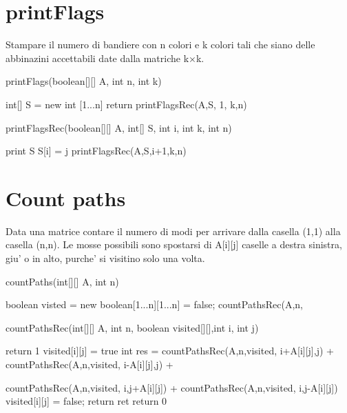 \documentclass[oneside]{book}
\begin{document}
\section{printFlags}
Stampare il numero di bandiere con n colori e k colori tali che siano delle abbinazini accettabili date dalla matriche k$\times$k.

\begin{algorithm}
\caption{printFlags(boolean[][] A, int n, int k)\label{alg:cap}}
\begin{algorithmic}
\State int[] S = new int [1...n]
\State return printFlagsRec(A,S, 1, k,n)
\end{algorithmic}
\end{algorithm}

\begin{algorithm}
\caption{printFlagsRec(boolean[][] A, int[] S, int i, int k, int n)\label{alg:cap}}
\begin{algorithmic}
\If{}
	\State print S
\Else
		\If{i == 1 \textbf{or} A[j][S[i-1]}
			\State S[i] = j
			printFlagsRec(A,S,i+1,k,n)
		\EndIf

	\EndFor
\EndIf

\end{algorithmic}
\end{algorithm}
\newpage
\section{Count paths}
Data una matrice contare il numero di modi per arrivare dalla casella (1,1) alla casella (n,n). Le mosse possibili sono spostarsi di A[i][j] caselle a destra sinistra, giu' o in alto, purche' si visitino solo una volta.

\begin{algorithm}
\caption{countPaths(int[][] A, int n)}
\begin{algorithmic}
\State boolean visted = new boolean[1...n][1...n] = false;
\State countPathsRec(A,n,
\end{algorithmic}
\end{algorithm}


\begin{algorithm}
\caption{countPathsRec(int[][] A, int n, boolean visited[][],int i, int j)}
\begin{algorithmic}
	return 1
	\State visited[i][j] = true
	\State int res = 
	\State countPathsRec(A,n,visited, i+A[i][j],j) + 
	\State countPathsRec(A,n,visited, i-A[i][j],j) + 
	
	\State countPathsRec(A,n,visited, i,j+A[i][j]) + 
	\State countPathsRec(A,n,visited, i,j-A[i][j]) 
	\State visited[i][j] = false;
	\State return ret
\Else
	\State return 0
\EndIf
\end{algorithmic}
\end{algorithm}
\newpage
\end{document}
